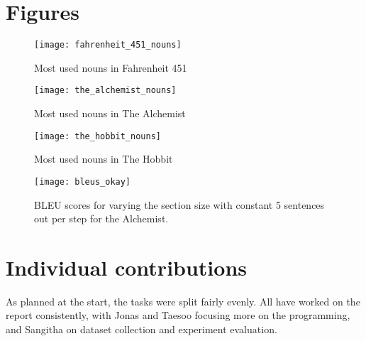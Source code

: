 \begin{appendices}
\section{Figures}
\label{appendix:countfigs}
\begin{figure}[H]
	\centering
	\texttt{[image: fahrenheit\_451\_nouns]}
	\caption{Most used nouns in Fahrenheit 451}\label{fig:fahrenheit_451_nouns}
\end{figure}

\begin{figure}[H]
	\centering
	\texttt{[image: the\_alchemist\_nouns]}
	\caption{Most used nouns in The Alchemist}\label{fig:the_alchemist_nouns}
\end{figure}

\begin{figure}[H]
	\centering
	\texttt{[image: the\_hobbit\_nouns]}
	\caption{Most used nouns in The Hobbit}\label{fig:the_hobbit_nouns}
\end{figure}

\begin{figure}[H]
	\centering
	\texttt{[image: bleus\_okay]}
	\caption{BLEU scores for varying the section size with constant 5 sentences out per step for the Alchemist. }\label{fig:bleus_okay}
\end{figure}


\section{Individual contributions}
As planned at the start, the tasks were split fairly evenly. All have worked on the report consistently, with Jonas and Taesoo focusing more on the programming, and Sangitha on dataset collection and experiment evaluation.

\end{appendices}